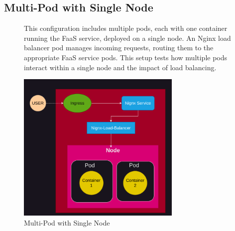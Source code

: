 \documentclass{article}
\begin{document}
\subsection{Multi-Pod with Single Node}
\nobreak
\vspace{-30px}
\begin{figure}[h]
    \begin{minipage}[t]{0.6\textwidth}
        \vspace{-120px}
        This configuration includes multiple pods, each with one container running the
        FaaS service, deployed on a single node. An Nginx load balancer pod manages
        incoming requests, routing them to the appropriate FaaS service pods. This
        setup tests how multiple pods interact within a single node and the impact of
        load balancing.
    \end{minipage}%
    \hfill
    \begin{minipage}[b]{0.4\textwidth}
        \centering
        \includegraphics[width=0.7\textwidth]{../images/one_node_two_pod.png}
        \caption{Multi-Pod with Single Node}
        \label{fig:multi_pod_single_node}
    \end{minipage}
\end{figure}

\vspace{-10px}
\end{document}
